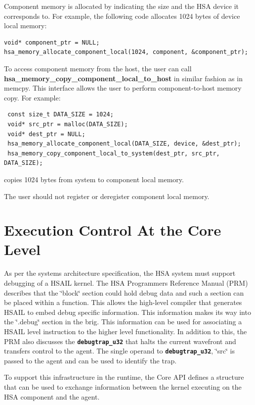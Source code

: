 \documentclass{book}
\newcommand{\diffblock}[1]{#1}
\newcommand{\ttbf}[1]{\diffblock{\texttt{\textbf{#1}}}}
\newcommand{\reffun}[1]{\textbf{#1}}
\begin{document}
Component memory is allocated by indicating the size and the HSA
device it corresponds to. For example, the following code allocates
1024 bytes of device local memory:

\begin{lstlisting}
void* component_ptr = NULL;
hsa_memory_allocate_component_local(1024, component, &component_ptr);
\end{lstlisting}

To access component memory from the host, the user can call
\reffun{hsa\_memory\_copy\_component\_local\_to\_host} in similar
fashion as in memcpy. This interface allows the user to
perform component-\/to-\/host memory copy. For example:

\begin{lstlisting}
 const size_t DATA_SIZE = 1024;
 void* src_ptr = malloc(DATA_SIZE);
 void* dest_ptr = NULL;
 hsa_memory_allocate_component_local(DATA_SIZE, device, &dest_ptr);
 hsa_memory_copy_component_local_to_system(dest_ptr, src_ptr, DATA_SIZE);
\end{lstlisting}

copies 1024 bytes from system to component local memory.

The user should not register or deregister component local memory.

 
\hypertarget{coreapi_coredebug}{}\section{Execution Control
  At the Core Level}\label{coreapi_coredebug}

As per the systems architecture specification, the HSA system must
support debugging of a HSAIL kernel. The HSA
Programmers Reference Manual (PRM) describes that the
\char`\"{}block\char`\"{} section could hold debug data and such a
section can be placed within a function. This allows the
high-\/level compiler that generates HSAIL to embed debug
specific information. This information makes its way into the
\char`\"{}.\-debug\char`\"{} section in the brig. This information
can be used for associating a HSAIL level instruction to the
higher level functionality. In addition to this, the PRM also
discusses the \ttbf{debugtrap\_u32} that halts the current wavefront
and transfers control to the agent.  The single operand to
\ttbf{debugtrap\_u32}, \char`\"{}src\char`\"{} is passed to the
agent and can be used to identify the trap.

To support this infrastructure in the runtime, the Core API
defines a structure that can be used to exchange information between
the kernel executing on the HSA component and the agent.
\end{document}
